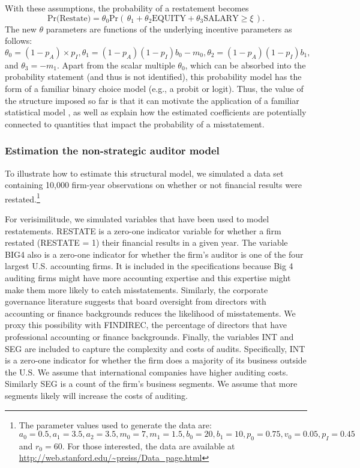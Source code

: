 \documentclass[12pt,reqno,titlepage]{amsart}
\theoremstyle{definition}
\begin{document}
\begin{doublespace}
With these assumptions, the probability of a restatement becomes
\begin{equation} \label{restate1}
\mbox{Pr(Restate)} = \theta_0 \mbox{Pr}\left(\, \theta_1 + \theta_2 \mbox{EQUITY} + \theta_3 \mbox{SALARY}  \ge \xi \,\right) .
\end{equation}
The new $\theta$ parameters are functions of the underlying incentive parameters as
follows: $\theta_0=(1-p_A) \times p_I, \theta_1 = (1 - p_A)(1 - p_I) b_0 - m_0, 
\theta_2 = (1 - p_A)(1 - p_I) b_1,$ and $\theta_3 = - m_1$. 
Apart from the scalar multiple $\theta_0$, which can be absorbed into the probability statement (and thus is not identified), this probability model has the form of a familiar binary choice model (e.g., a probit or logit).
Thus, the value of the structure imposed so far is that it can motivate the application of a familiar statistical model \citep[as in][]{Efendi:2007ja}, as well as explain how the estimated coefficients are potentially connected to quantities that impact the probability of a misstatement.

\subsubsection{Estimation the non-strategic auditor model}

To illustrate how to estimate this structural model, we simulated a data set containing 10,000 firm-year observations on whether or not financial results were restated.\footnote{The parameter values used to generate the data are: $a_0 = 0.5 , a_1 = 3.5 , a_2 = 3.5,
m_0 = 7, m_1 = 1.5, b_0 = 20, b_1 = 10, p_0 =0.75,
v_0 = 0.05, p_I = 0.45$ and $r_0 = 60$.
For those interested, the data are available at \url{http://web.stanford.edu/~preiss/Data_page.html}}

For verisimilitude, we simulated variables that have been used to model restatements. 
RESTATE is a zero-one indicator variable for whether a firm restated (RESTATE = 1) their financial results in a given year.  
The variable BIG4 also is a zero-one indicator for whether the firm's auditor is one of the four largest U.S. accounting firms. 
It is included in the specifications because Big 4 auditing firms might have more accounting expertise and this expertise might make them more likely to catch misstatements. 
Similarly, the corporate governance literature suggests that board oversight from directors with accounting or finance backgrounds reduces the likelihood of misstatements. We proxy this possibility with FINDIREC, the percentage of directors that have professional accounting or finance backgrounds.
Finally, the variables INT and SEG are included to capture the complexity and costs of audits. 
Specifically, INT is a zero-one indicator for whether the firm does a majority of its business outside the U.S.
We assume that international companies have higher auditing costs. 
Similarly SEG is a count of the firm's business segments. 
We assume that more segments likely will increase the costs of auditing. 


\end{doublespace}
\end{document}
